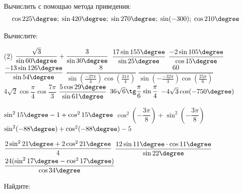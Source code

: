\begin{class}[number=2]
	\begin{listofex}
		\item Вычислить с помощью метода приведения: %
		\[ \cos 225 \degree;\;\sin 420 \degree;\;\sin 270 \degree;\;\sin (-300) ;\;\cos 210 \degree \]
		\item Вычислите: %
		\begin{tasks}(2)
			\task \( \dfrac{\sqrt{3}}{\sin60\degree}+\dfrac{3}{\sin30\degree} \)
			\task \( \dfrac{17\sin155\degree}{\sin25\degree} \)
			\task \( \dfrac{-2\sin105\degree}{\cos15\degree} \)
			\task \( \dfrac{-13\sin126\degree}{\sin54\degree} \)
			\task \( \dfrac{ 8 }{ \sin \left( \tfrac{ -27\pi }{ 4 } \right) \cos \left( \tfrac{ 31\pi }{ 4 } \right) } \)
			\task \( \dfrac{ 60 }{ \sin \left( -\tfrac{ -32\pi }{ 3 } \right) \cos \left( \tfrac{ 25\pi }{ 6 } \right)} \)
			\task \( 4 \sqrt{2} \cos \dfrac{ \pi }{ 4 } \cos \dfrac{ 7\pi }{3  } \)
			\task \( \dfrac{ 5 \cos 29 \degree }{ \sin 61 \degree } \)
			\task \( 36 \sqrt{6} \tg \dfrac{ \pi }{ 6 } \sin \dfrac{ \pi }{ 4 } \)
			\task \( -4 \sqrt{3} \cos (-750 \degree) \)
			
			\task \( \sin^215\degree-1+\cos^215 \degree \)
			\task \( \cos^2\left( -\dfrac{ 3\pi }{ 8 } \right) +\sin^2\left( -\dfrac{ 3\pi }{ 8 } \right) \)
			\task \( \sin^2 (-88\degree) + \cos^2 (-88\degree) -5 \)
			
			\task \( \dfrac{2\sin^221\degree+2\cos^221\degree}{4} \)
			\task \( \dfrac{ 12\sin 11 \degree \cdot \cos 11 \degree }{ \sin 22 \degree } \)
			\task \( \dfrac{ 24 (\sin^2 17 \degree-\cos^217 \degree) }{ \cos 34 \degree } \)
			
			
			
		\end{tasks}
		\item Найдите: %
		\begin{tasks}
			

\end{tasks}
\end{listofex}
\end{class}
